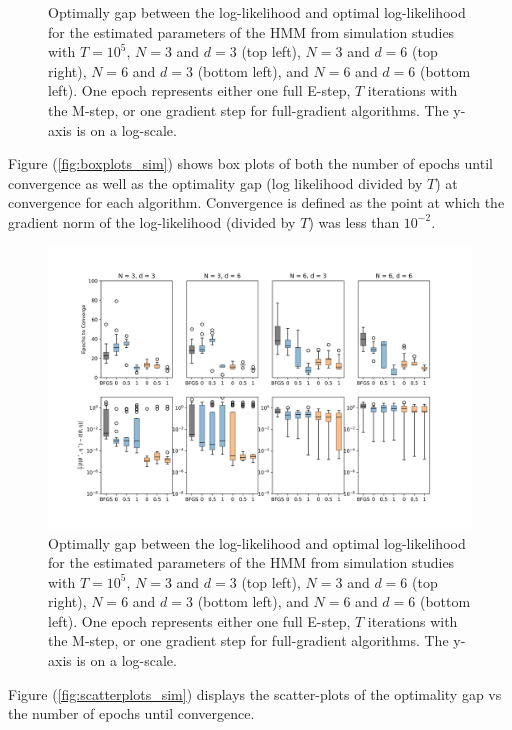 \begin{figure}
    \caption{Optimally gap between the log-likelihood and optimal log-likelihood for the estimated parameters of the HMM from simulation studies with $T=10^{5}$, $N=3$ and $d=3$ (top left), $N=3$ and $d=6$ (top right), $N=6$ and $d=3$ (bottom left), and $N=6$ and $d=6$ (bottom left). One epoch represents either one full E-step, $T$ iterations with the M-step, or one gradient step for full-gradient algorithms. The y-axis is on a log-scale.}
    \label{fig:ll_trace_sim}
\end{figure}
%
Figure (\ref{fig:boxplots_sim}) shows box plots of both the number of epochs until convergence as well as the optimality gap (log likelihood divided by $T$) at convergence for each algorithm. Convergence is defined as the point at which the gradient norm of the log-likelihood (divided by $T$) was less than $10^{-2}$.
%
\begin{figure}
    \centering
    \includegraphics[width=6.5in]{../plt/boxplots_sim.png}
    \caption{Optimally gap between the log-likelihood and optimal log-likelihood for the estimated parameters of the HMM from simulation studies with $T=10^{5}$, $N=3$ and $d=3$ (top left), $N=3$ and $d=6$ (top right), $N=6$ and $d=3$ (bottom left), and $N=6$ and $d=6$ (bottom left). One epoch represents either one full E-step, $T$ iterations with the M-step, or one gradient step for full-gradient algorithms. The y-axis is on a log-scale.}
    \label{fig:scatter_sim}
\end{figure}
%
Figure (\ref{fig:scatterplots_sim}) displays the scatter-plots of the optimality gap vs the number of epochs until convergence.
%
